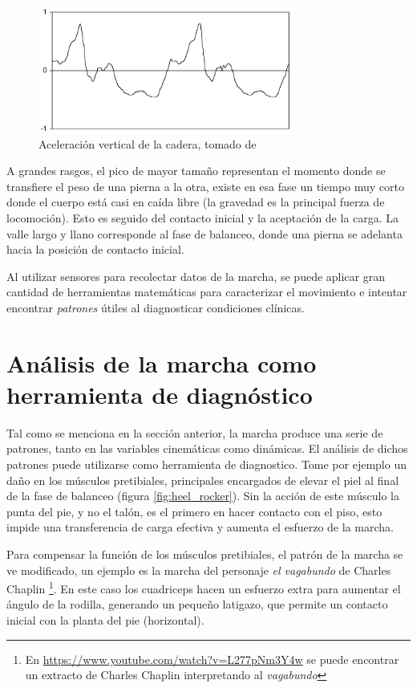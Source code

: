 \begin{figure}
    \centering
    \includegraphics[width = 0.75\textwidth]{imagenes/menz_acceleration}
    \caption{Aceleración vertical de la cadera, tomado de \citep{menz}}
    \label{fig:menz_acc_ver}
\end{figure}

A grandes rasgos, el pico de mayor tamaño representan el momento donde se transfiere el peso de una pierna a la otra, existe en esa fase un tiempo muy corto donde el cuerpo está casi en caída libre (la gravedad es la principal fuerza de locomoción). Esto es seguido del contacto inicial y la aceptación de la carga. La valle largo y llano corresponde al fase de balanceo, donde una pierna se adelanta hacia la posición de contacto inicial.

Al utilizar sensores para recolectar datos de la marcha, se puede aplicar gran cantidad de herramientas matemáticas para caracterizar el movimiento e intentar encontrar \emph{patrones} útiles al diagnosticar condiciones clínicas. 





\section[Herramienta de diagnóstico]{Análisis de la marcha como herramienta de diagnóstico}

Tal como se menciona en la sección anterior, la marcha produce una serie de patrones, tanto en las variables cinemáticas como dinámicas. El análisis de dichos patrones puede utilizarse como herramienta de diagnostico. Tome por ejemplo un daño en los músculos pretibiales, principales encargados de elevar el piel al final de la fase de balanceo (figura \ref{fig:heel_rocker}). Sin la acción de este músculo la punta del pie, y no el talón, es el primero en hacer contacto con el piso, esto impide una transferencia de carga efectiva y aumenta el esfuerzo de la marcha.

Para compensar la función de los músculos pretibiales, el patrón de la marcha se ve modificado, un ejemplo es la marcha del personaje \emph{el vagabundo} de Charles Chaplin \footnote{En \url{https://www.youtube.com/watch?v=L277pNm3Y4w} se puede encontrar un extracto de Charles Chaplin interpretando al \emph{vagabundo}}. En este caso los cuadriceps hacen un esfuerzo extra para aumentar el ángulo de la rodilla, generando un pequeño latigazo, que permite un contacto inicial con la planta del pie (horizontal).

